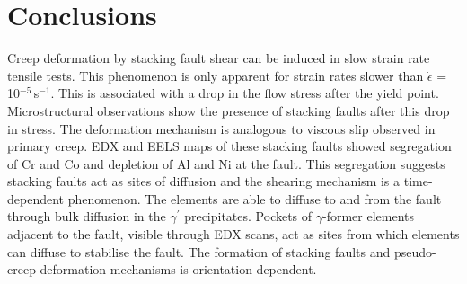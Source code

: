 \documentclass[a4paper,12pt,times,numbered,print,index]{Classes/PhDThesisPSnPDF}
\begin{document}

\section*{Conclusions}
Creep deformation by stacking fault shear can be induced in slow strain rate tensile tests. This phenomenon is only apparent for strain rates slower than $\dot{\epsilon}$ = 10$^{-5}$\,s$^{-1}$. This is associated with a drop in the flow stress after the yield point. Microstructural observations show the presence of stacking faults after this drop in stress. The deformation mechanism is analogous to viscous slip observed in primary creep. EDX and EELS maps of these stacking faults showed segregation of Cr and Co and depletion of Al and Ni at the fault. This segregation suggests stacking faults act as sites of diffusion and the shearing mechanism is a time-dependent phenomenon. The elements are able to diffuse to and from the fault through bulk diffusion in the $\gamma^{\prime}$ precipitates. Pockets of $\gamma$-former elements adjacent to the fault, visible through EDX scans, act as sites from which elements can diffuse to stabilise the fault. The formation of stacking faults and pseudo-creep deformation mechanisms is orientation dependent.
\end{document}

